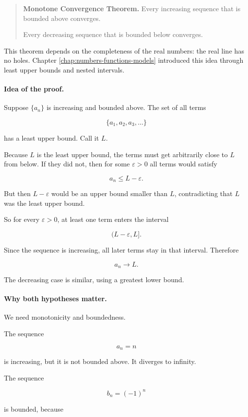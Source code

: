 \begin{quote}
\textbf{Monotone Convergence Theorem.}
Every increasing sequence that is bounded above converges.

Every decreasing sequence that is bounded below converges.
\end{quote}

This theorem depends on the completeness of the real numbers: the real line has no
holes.  Chapter \ref{chap:numbers-functions-models} introduced this idea through least
upper bounds and nested intervals.

\paragraph{Idea of the proof.}
Suppose \(\{a_n\}\) is increasing and bounded above.  The set of all terms

\[
\{a_1,a_2,a_3,\ldots\}
\]

has a least upper bound.  Call it \(L\).

Because \(L\) is the least upper bound, the terms must get arbitrarily close to \(L\) from
below.  If they did not, then for some \(\varepsilon>0\) all terms would satisfy

\[
a_n\le L-\varepsilon.
\]

But then \(L-\varepsilon\) would be an upper bound smaller than \(L\), contradicting
that \(L\) was the least upper bound.

So for every \(\varepsilon>0\), at least one term enters the interval

\[
(L-\varepsilon,L].
\]

Since the sequence is increasing, all later terms stay in that interval.  Therefore

\[
a_n\to L.
\]

The decreasing case is similar, using a greatest lower bound.

\paragraph{Why both hypotheses matter.}
We need monotonicity and boundedness.

The sequence

\[
a_n=n
\]

is increasing, but it is not bounded above.  It diverges to infinity.

The sequence

\[
b_n=(-1)^n
\]

is bounded, because

